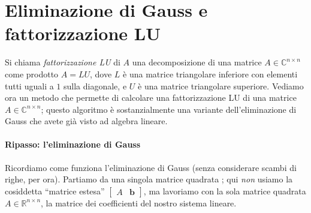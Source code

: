 \documentclass[a4paper]{report}
\theoremstyle{definiton}
\theoremstyle{remark}
\renewcommand{\b}{\mathbf{b}}
\begin{document}
\section{Eliminazione di Gauss e fattorizzazione LU}

Si chiama \emph{fattorizzazione LU} di $A$ una decomposizione di una matrice $A\in\mathbb{C}^{n\times n}$ come prodotto $A=LU$, dove $L$ è una matrice triangolare inferiore con elementi tutti uguali a $1$ sulla diagonale, e $U$ è una matrice triangolare superiore. Vediamo ora un metodo che permette di calcolare una fattorizzazione LU di una matrice $A \in \mathbb{C}^{n\times n}$; questo algoritmo è sostanzialmente una variante dell'eliminazione di Gauss che avete già visto ad algebra lineare.


\paragraph{Ripasso: l'eliminazione di Gauss} Ricordiamo come funziona l'eliminazione di Gauss (senza considerare scambi di righe, per ora). Partiamo da una singola matrice quadrata ; qui \emph{non} usiamo la cosiddetta ``matrice estesa'' $\begin{bmatrix}
    A & \b
\end{bmatrix}$, ma lavoriamo con la sola matrice quadrata $A\in\mathbb{R}^{n\times n}$, la matrice dei coefficienti del nostro sistema lineare.
\end{document}
